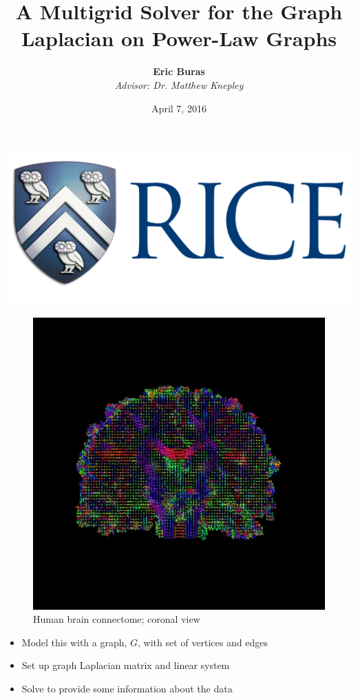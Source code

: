 \documentclass[xcolor=dvipsnames,10pt]{beamer}
\title[Rice University]  {A Multigrid Solver for the Graph Laplacian on Power-Law Graphs}
\author[Buras]{\Large\textbf{Eric Buras}\\
\vspace{.15in}
\textit{\normalsize Advisor: Dr. Matthew Knepley}}
\date{April 7, 2016}
\institute[]{Rice University \\ Department of Computational and Applied Mathematics}
\begin{document}
 
\begin{frame}
  \titlepage
  \begin{center}
\includegraphics[width=.3\linewidth]{rice.png}
\end{center}
\end{frame}

\begin{frame}
\begin{figure}
\includegraphics[width=.65\linewidth]{HumanConnectome.png}
\caption{Human brain connectome; coronal view \cite{Toga:2012}}
\end{figure}
\end{frame}

\begin{frame}
\large
\begin{itemize}
\item Model this with a graph, $G$, with set of vertices and edges
\vspace{.15in}
\item Set up graph Laplacian matrix and linear system
\vspace{.15in}
\item Solve to provide some information about the data
\end{itemize}
\normalsize
\end{frame}
\end{document}
